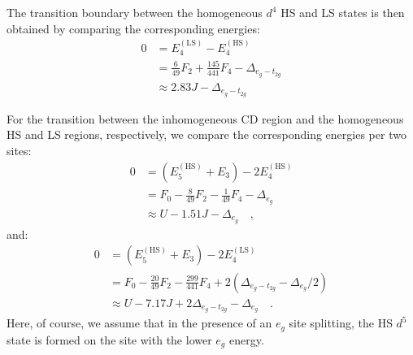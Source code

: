 \documentclass[aps,prb,twocolumn,superscriptaddress,10pt]{revtex4-1}
\newcommand{\eg}{\ensuremath{{e_g}}\xspace}
\newcommand{\ttg}{\ensuremath{{t_{2g}}}\xspace}
\begin{document}
The transition boundary between the homogeneous $d^4$ HS and LS states is then obtained by comparing the corresponding energies:
\begin{align}
    0 &= E_4^\mathrm{(LS)} - E_4^\mathrm{(HS)} \nonumber\\
    &= \frac6{49} F_2 + \frac{145}{441} F_4 - \Delta_{\eg - \ttg} \nonumber\\
    &\approx 2.83 J - \Delta_{\eg - \ttg}
\end{align}

For the transition between the inhomogeneous CD region and the homogeneous HS and LS regions, respectively, we compare the corresponding energies per two sites:
\begin{align}
    0 &= \left(E_5^\mathrm{(HS)} + E_3\right) - 2 E_4^\mathrm{(HS)} \nonumber\\
      &= F_0 - \frac8{49} F_2 - \frac1{49} F_4 - \Delta_\eg          \nonumber \\
      &\approx U - 1.51 J - \Delta_\eg \quad ,
      \label{eq:phase-boundary1}
\end{align}
and:
\begin{align}
    0 &= \left(E_5^\mathrm{(HS)} + E_3\right) - 2 E_4^\mathrm{(LS)} \nonumber\\
      &= F_0 - \frac{20}{49} F_2 - \frac{299}{441} F_4 + 2(\Delta_{\eg - \ttg} - \Delta_\eg / 2) \nonumber\\
      &\approx U - 7.17 J + 2\Delta_{\eg - \ttg} - \Delta_\eg \quad .
\end{align}
Here, of course, we assume that in the presence of an \eg site splitting, the HS $d^5$ state is formed on the site with the lower \eg energy.
\end{document}
